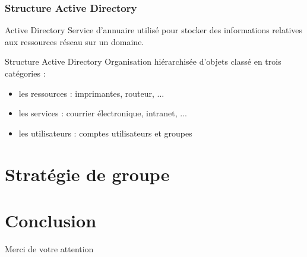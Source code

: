 \documentclass{beamer}
\begin{document}
  \begin{frame}
    \frametitle{Structure Active Directory}
    \begin{block}{Active Directory}
      Service d'annuaire utilisé pour stocker des informations relatives aux ressources réseau sur un domaine.
    \end{block}    
    \begin{block}{Structure Active Directory}
      Organisation hiérarchisée d'objets classé en trois catégories :
      \begin{itemize}
       \item les ressources : imprimantes, routeur, ...
       \item les services : courrier électronique, intranet, ...
       \item les utilisateurs : comptes utilisateurs et groupes
      \end{itemize}
    \end{block}
  \end{frame}

  \section{Stratégie de groupe}
  
  
  \section{Conclusion}
  
  \begin{frame}
    \begin{center}
      Merci de votre attention
    \end{center}
  \end{frame}
\end{document}
